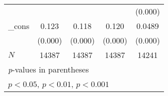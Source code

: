 {\begin{tabular}{l*{4}{c}}
            &                     &                     &                     &     (0.000)         \\
[1em]
\_cons      &       0.123\sym{***}&       0.118\sym{***}&       0.120\sym{***}&      0.0489\sym{***}\\
            &     (0.000)         &     (0.000)         &     (0.000)         &     (0.000)         \\
\hline
\(N\)       &       14387         &       14387         &       14387         &       14241         \\
\hline\hline
\multicolumn{5}{l}{\footnotesize \textit{p}-values in parentheses}\\
\multicolumn{5}{l}{\footnotesize \sym{*} \(p<0.05\), \sym{**} \(p<0.01\), \sym{***} \(p<0.001\)}\\
\end{tabular}
}
